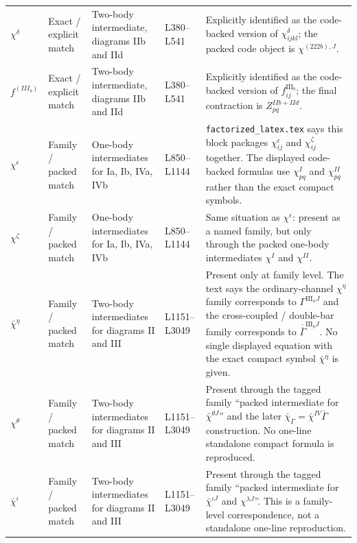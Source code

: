 \documentclass{article}
\begin{document}
\begin{longtable}{p{} p{} p{} p{} p{}}
$\chi^{\delta}$ & Exact / explicit match & Two-body intermediate, diagrams IIb and IId & L380--L541 & Explicitly identified as the code-backed version of $\chi^{\delta}_{ijkl}$; the packed code object is $\chi^{(222b),J}$. \\

$f^{(III_b)}$ & Exact / explicit match & Two-body intermediate, diagrams IIb and IId & L380--L541 & Explicitly identified as the code-backed version of $f^{\mathrm{III}_b}_{ij}$; the final contraction is $Z^{IIb+IId}_{pq}$. \\

$\chi^{\epsilon}$ & Family / packed match & One-body intermediates for Ia, Ib, IVa, IVb & L850--L1144 & \texttt{factorized\_latex.tex} says this block packages $\chi^{\epsilon}_{ij}$ and $\chi^{\zeta}_{ij}$ together. The displayed code-backed formulas use $\chi^I_{pq}$ and $\chi^{II}_{pq}$ rather than the exact compact symbols. \\

$\chi^{\zeta}$ & Family / packed match & One-body intermediates for Ia, Ib, IVa, IVb & L850--L1144 & Same situation as $\chi^{\epsilon}$: present as a named family, but only through the packed one-body intermediates $\chi^I$ and $\chi^{II}$. \\

$\bar\chi^{\eta}$ & Family / packed match & Two-body intermediates for diagrams II and III & L1151--L3049 & Present only at family level. The text says the ordinary-channel $\chi^{\eta}$ family corresponds to $\Gamma^{\mathrm{III}_aJ}$ and the cross-coupled / double-bar family corresponds to $\overline{\overline\Gamma}^{\mathrm{III}_bJ}$. No single displayed equation with the exact compact symbol $\bar\chi^{\eta}$ is given. \\

$\chi^{\theta}$ & Family / packed match & Two-body intermediates for diagrams II and III & L1151--L3049 & Present through the tagged family ``packed intermediate for $\bar\chi^{\theta J}$'' and the later $\bar\chi_\Gamma = \bar\chi^{IV}\bar\Gamma$ construction. No one-line standalone compact formula is reproduced. \\

$\bar\chi^{\iota}$ & Family / packed match & Two-body intermediates for diagrams II and III & L1151--L3049 & Present through the tagged family ``packed intermediate for $\bar\chi^{\iota J}$ and $\chi^{\lambda J}$''. This is a family-level correspondence, not a standalone one-line reproduction. \\


\end{longtable}
\end{document}
